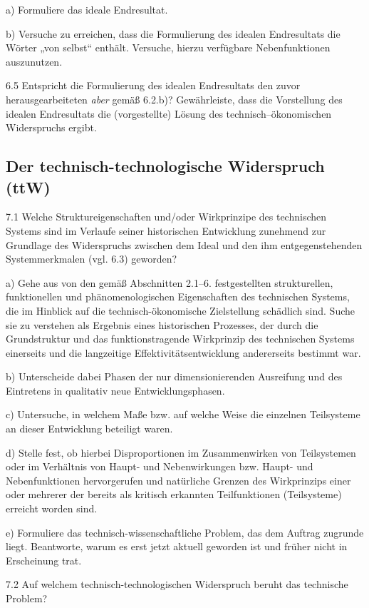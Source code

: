 \documentclass[12pt,a4paper]{article}
\begin{document}
a) Formuliere das ideale Endresultat.

b) Versuche zu erreichen, dass die Formulierung des idealen Endresultats die
Wörter „von selbst“ enthält. Versuche, hierzu verfügbare Nebenfunktionen
auszunutzen.

6.5 Entspricht die Formulierung des idealen Endresultats den zuvor
herausgearbeiteten \emph{aber} gemäß 6.2.b)?  Gewährleiste, dass die
Vorstellung des idealen Endresultats die (vorgestellte) Lösung des
technisch–ökonomischen Widerspruchs ergibt.

\subsection{Der technisch-technologische Widerspruch (ttW)}

7.1 Welche Struktureigenschaften und/oder Wirkprinzipe des technischen Systems
sind im Verlaufe seiner historischen Entwicklung zunehmend zur Grundlage des
Widerspruchs zwischen dem Ideal und den ihm entgegenstehenden Systemmerkmalen
(vgl. 6.3) geworden?

a) Gehe aus von den gemäß Abschnitten 2.1--6. festgestellten strukturellen,
funktionellen und phänomenologischen Eigenschaften des technischen Systems, die
im Hinblick auf die technisch-ökonomische Zielstellung schädlich sind. Suche
sie zu verstehen als Ergebnis eines historischen Prozesses, der durch die
Grundstruktur und das funktionstragende Wirkprinzip des technischen Systems
einerseits und die langzeitige Effektivitätsentwicklung andererseits bestimmt
war.

b) Unterscheide dabei Phasen der nur dimensionierenden Ausreifung und des
Eintretens in qualitativ neue Entwicklungsphasen.

c) Untersuche, in welchem Maße bzw. auf welche Weise die einzelnen Teilsysteme
an dieser Entwicklung beteiligt waren.

d) Stelle fest, ob hierbei Disproportionen im Zusammenwirken von Teilsystemen
oder im Verhältnis von Haupt- und Nebenwirkungen bzw. Haupt- und
Nebenfunktionen hervorgerufen und natürliche Grenzen des Wirkprinzips einer
oder mehrerer der bereits als kritisch erkannten Teilfunktionen (Teilsysteme)
erreicht worden sind.

e) Formuliere das technisch-wissenschaftliche Problem, das dem Auftrag zugrunde
liegt. Beantworte, warum es erst jetzt aktuell geworden ist und früher nicht in
Erscheinung trat.

7.2 Auf welchem technisch-technologischen Widerspruch beruht das technische
Problem?
\end{document}
